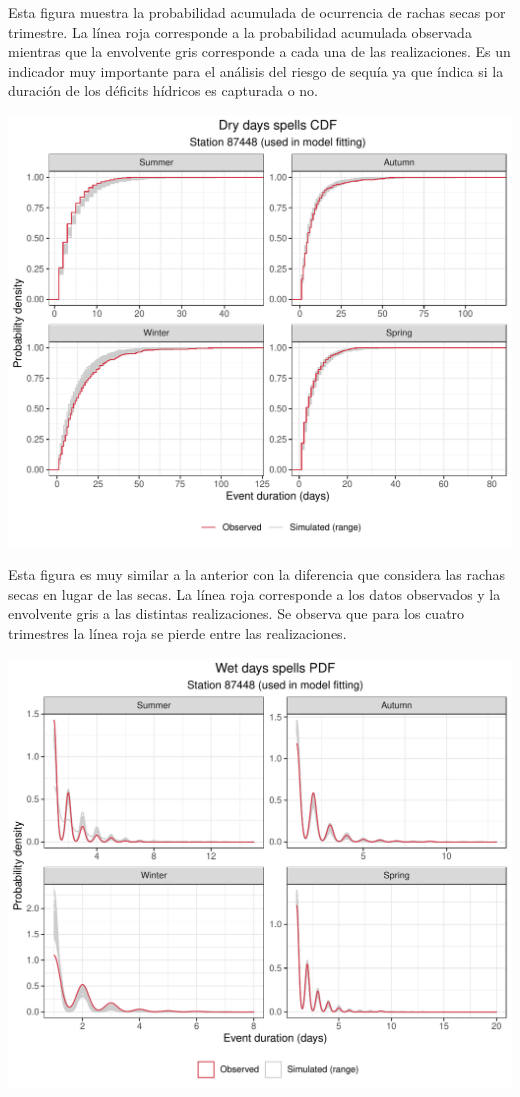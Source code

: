 \documentclass[
]{article}
\begin{document}
Esta figura muestra la probabilidad acumulada de ocurrencia de rachas secas por trimestre. La línea roja corresponde a la probabilidad acumulada observada mientras que la envolvente gris corresponde a cada una de las realizaciones. Es un indicador muy importante para el análisis del riesgo de sequía ya que índica si la duración de los déficits hídricos es capturada o no.

\begin{center}\includegraphics{Webinario_Generador_files/figure-latex/unnamed-chunk-30-1} \end{center}

Esta figura es muy similar a la anterior con la diferencia que considera las rachas secas en lugar de las secas. La línea roja corresponde a los datos observados y la envolvente gris a las distintas realizaciones. Se observa que para los cuatro trimestres la línea roja se pierde entre las realizaciones.

\begin{center}\includegraphics{Webinario_Generador_files/figure-latex/unnamed-chunk-31-1} \end{center}
\end{document}
